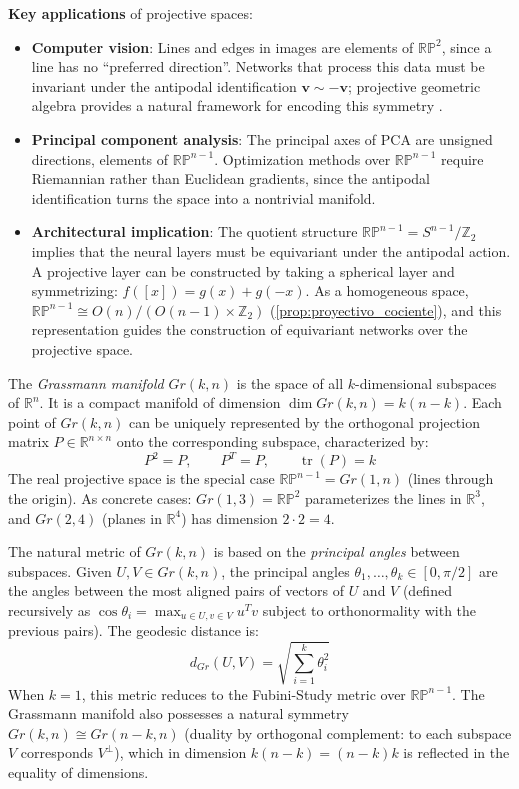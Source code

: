 \textbf{Key applications} of projective spaces:
\begin{itemize}
    \item \textbf{Computer vision}: Lines and edges in images are elements of $\mathbb{RP}^2$, since a line has no ``preferred direction''. Networks that process this data must be invariant under the antipodal identification $\mathbf{v} \sim -\mathbf{v}$; projective geometric algebra provides a natural framework for encoding this symmetry \citep{dehaan2024euclideanprojectiveconformalchoosing}.

    \item \textbf{Principal component analysis}: The principal axes of \gls{PCA} are unsigned directions, elements of $\mathbb{RP}^{n-1}$. Optimization methods over $\mathbb{RP}^{n-1}$ require Riemannian rather than Euclidean gradients, since the antipodal identification turns the space into a nontrivial manifold.

    \item \textbf{Architectural implication}: The quotient structure $\mathbb{RP}^{n-1} = S^{n-1}/\mathbb{Z}_2$ implies that the neural layers must be equivariant under the antipodal action. A projective layer can be constructed by taking a spherical layer and symmetrizing: $f([x]) = g(x) + g(-x)$. As a homogeneous space, $\mathbb{RP}^{n-1} \cong O(n)/(O(n-1) \times \mathbb{Z}_2)$ (\autoref{prop:proyectivo_cociente}), and this representation guides the construction of equivariant networks over the projective space.
\end{itemize}

\begin{definition}\label{def:variedad_grassmann}
The \textit{Grassmann manifold} $Gr(k,n)$ is the space of all $k$-dimensional subspaces of $\mathbb{R}^n$. It is a compact manifold of dimension $\dim Gr(k,n) = k(n-k)$. Each point of $Gr(k,n)$ can be uniquely represented by the orthogonal projection matrix $P \in \mathbb{R}^{n \times n}$ onto the corresponding subspace, characterized by:
\[
P^2 = P, \qquad P^T = P, \qquad \operatorname{tr}(P) = k
\]
The real projective space is the special case $\mathbb{RP}^{n-1} = Gr(1,n)$ (lines through the origin). As concrete cases: $Gr(1,3) = \mathbb{RP}^2$ parameterizes the lines in $\mathbb{R}^3$, and $Gr(2,4)$ (planes in $\mathbb{R}^4$) has dimension $2 \cdot 2 = 4$.
\end{definition}

The natural metric of $Gr(k,n)$ is based on the \textit{principal angles} between subspaces. Given $U, V \in Gr(k,n)$, the principal angles $\theta_1, \ldots, \theta_k \in [0, \pi/2]$ are the angles between the most aligned pairs of vectors of $U$ and $V$ (defined recursively as $\cos \theta_i = \max_{u \in U, v \in V} u^T v$ subject to orthonormality with the previous pairs). The geodesic distance is:
\[
d_{Gr}(U, V) = \sqrt{\sum_{i=1}^{k} \theta_i^2}
\]
When $k = 1$, this metric reduces to the Fubini-Study metric over $\mathbb{RP}^{n-1}$. The Grassmann manifold also possesses a natural symmetry $Gr(k,n) \cong Gr(n-k,n)$ (duality by orthogonal complement: to each subspace $V$ corresponds $V^\perp$), which in dimension $k(n-k) = (n-k)k$ is reflected in the equality of dimensions.

